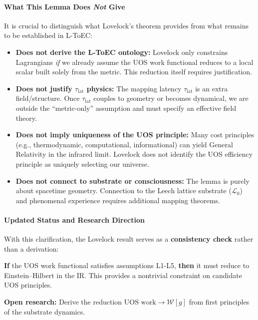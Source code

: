 \paragraph{What This Lemma Does \emph{Not} Give}
It is crucial to distinguish what Lovelock's theorem provides from what remains to be established in L-ToEC:

\begin{itemize}
\item \textbf{Does not derive the L-ToEC ontology:} Lovelock only constrains Lagrangians \emph{if} we already assume the UOS work functional reduces to a local scalar built solely from the metric. This reduction itself requires justification.

\item \textbf{Does not justify $\tau_{\mathrm{lat}}$ physics:} The mapping latency $\tau_{\mathrm{lat}}$ is an extra field/structure. Once $\tau_{\mathrm{lat}}$ couples to geometry or becomes dynamical, we are outside the ``metric-only'' assumption and must specify an effective field theory.

\item \textbf{Does not imply uniqueness of the UOS principle:} Many cost principles (e.g., thermodynamic, computational, informational) can yield General Relativity in the infrared limit. Lovelock does not identify the UOS efficiency principle as uniquely selecting our universe.

\item \textbf{Does not connect to substrate or consciousness:} The lemma is purely about spacetime geometry. Connection to the Leech lattice substrate ($\mathcal{L}_0$) and phenomenal experience requires additional mapping theorems.
\end{itemize}

\paragraph{Updated Status and Research Direction}
With this clarification, the Lovelock result serves as a \textbf{consistency check} rather than a derivation:

\begin{tcolorbox}[colback=blue!5!white,colframe=blue!75!black,title=Consistency Check Passed]
\textbf{If} the UOS work functional satisfies assumptions L1-L5, \textbf{then} it must reduce to Einstein--Hilbert in the IR. This provides a nontrivial constraint on candidate UOS principles.

\textbf{Open research:} Derive the reduction $\text{UOS work} \to \mathcal{W}[g]$ from first principles of the substrate dynamics.
\end{tcolorbox}

